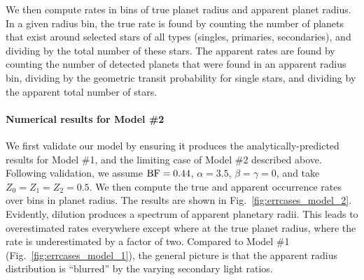 We then compute rates in bins of true planet radius and apparent planet radius.
In a given radius bin, the true rate is found by counting the number of planets
that exist around selected stars of all types (singles, primaries,
secondaries), and dividing by the total number of these stars.
The apparent rates are found by counting the number of detected planets that
were found in an apparent radius bin, dividing by the geometric transit
probability for single stars, and dividing by the apparent total number of
stars.


\paragraph{Numerical results for Model \#2}
We first validate our model by ensuring it produces the analytically-predicted 
results for Model \#1, and the limiting case of Model \#2 described above.
Following validation, we assume ${\rm BF}=0.44$, $\alpha=3.5$, 
$\beta=\gamma=0$, and take $Z_0=Z_1=Z_2=0.5$. We then compute the true and 
apparent occurrence rates over bins in planet radius.
The results are shown in Fig.~\ref{fig:errcases_model_2}.
Evidently, dilution produces a spectrum of apparent planetary radii. This 
leads to overestimated rates everywhere except where at the true planet 
radius, where the rate is underestimated by a factor of two.
Compared to Model \#1 (Fig.~\ref{fig:errcases_model_1}), the general picture 
is that the apparent radius distribution is ``blurred'' by the varying 
secondary light ratios.